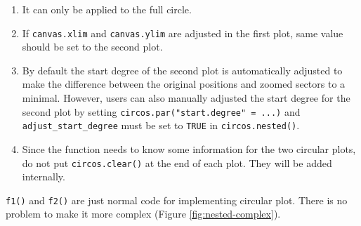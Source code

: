 \documentclass[]{book}
\providecommand{\tightlist}{%
  \setlength{\itemsep}{0pt}\setlength{\parskip}{0pt}}
\theoremstyle{definition}
\theoremstyle{definition}
\theoremstyle{remark}
\begin{document}
\begin{enumerate}
\def\labelenumi{\arabic{enumi}.}
\tightlist
\item
  It can only be applied to the full circle.
\item
  If \texttt{canvas.xlim} and \texttt{canvas.ylim} are adjusted in the
  first plot, same value should be set to the second plot.
\item
  By default the start degree of the second plot is automatically
  adjusted to make the difference between the original positions and
  zoomed sectors to a minimal. However, users can also manually adjusted
  the start degree for the second plot by setting
  \texttt{circos.par("start.degree"\ =\ ...)} and
  \texttt{adjust\_start\_degree} must be set to \texttt{TRUE} in
  \texttt{circos.nested()}.
\item
  Since the function needs to know some information for the two circular
  plots, do not put \texttt{circos.clear()} at the end of each plot.
  They will be added internally.
\end{enumerate}

\texttt{f1()} and \texttt{f2()} are just normal code for implementing
circular plot. There is no problem to make it more complex (Figure
\ref{fig:nested-complex}).
\end{document}
